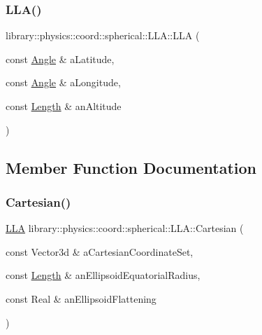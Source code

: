 \subsubsection{\texorpdfstring{L\+L\+A()}{LLA()}}
{\footnotesize\ttfamily library\+::physics\+::coord\+::spherical\+::\+L\+L\+A\+::\+L\+LA (\begin{DoxyParamCaption}\item[{const \hyperlink{classlibrary_1_1physics_1_1units_1_1_angle}{Angle} \&}]{a\+Latitude,  }\item[{const \hyperlink{classlibrary_1_1physics_1_1units_1_1_angle}{Angle} \&}]{a\+Longitude,  }\item[{const \hyperlink{classlibrary_1_1physics_1_1units_1_1_length}{Length} \&}]{an\+Altitude }\end{DoxyParamCaption})}



\subsection{Member Function Documentation}
\mbox{\label{classlibrary_1_1physics_1_1coord_1_1spherical_1_1_l_l_a_af48c6fa8a250c20befa8452d234537d1}} 
\subsubsection{\texorpdfstring{Cartesian()}{Cartesian()}}
{\footnotesize\ttfamily \hyperlink{classlibrary_1_1physics_1_1coord_1_1spherical_1_1_l_l_a}{L\+LA} library\+::physics\+::coord\+::spherical\+::\+L\+L\+A\+::\+Cartesian (\begin{DoxyParamCaption}\item[{const Vector3d \&}]{a\+Cartesian\+Coordinate\+Set,  }\item[{const \hyperlink{classlibrary_1_1physics_1_1units_1_1_length}{Length} \&}]{an\+Ellipsoid\+Equatorial\+Radius,  }\item[{const Real \&}]{an\+Ellipsoid\+Flattening }\end{DoxyParamCaption})\hspace{0.3cm}{\ttfamily [static]}}

\mbox{\label{classlibrary_1_1physics_1_1coord_1_1spherical_1_1_l_l_a_a2f35237c136581669e9a49e310633b58}} 
